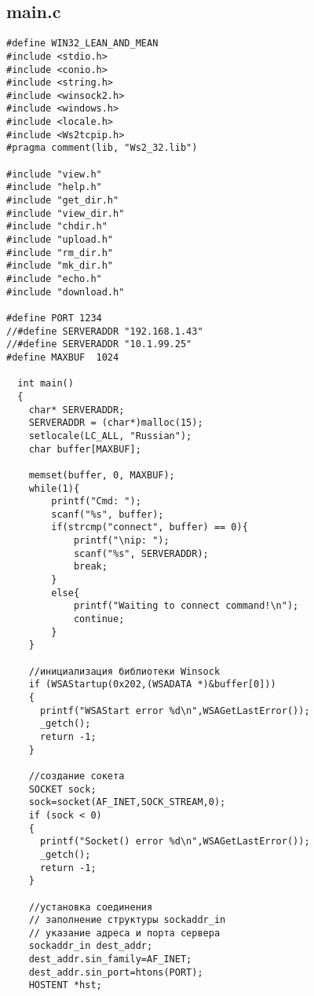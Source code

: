 \documentclass[12pt,a4paper]{report}
\begin{document}
\subsection*{main.c}
\begin{lstlisting}
#define WIN32_LEAN_AND_MEAN  
#include <stdio.h>
#include <conio.h>
#include <string.h>
#include <winsock2.h>
#include <windows.h>
#include <locale.h> 
#include <Ws2tcpip.h>
#pragma comment(lib, "Ws2_32.lib")

#include "view.h"
#include "help.h"
#include "get_dir.h"
#include "view_dir.h"
#include "chdir.h"
#include "upload.h"
#include "rm_dir.h"
#include "mk_dir.h"
#include "echo.h"
#include "download.h"

#define PORT 1234
//#define SERVERADDR "192.168.1.43"
//#define SERVERADDR "10.1.99.25"
#define MAXBUF  1024

  int main()
  {
	char* SERVERADDR;
	SERVERADDR = (char*)malloc(15);
    setlocale(LC_ALL, "Russian");
	char buffer[MAXBUF];
	
	memset(buffer, 0, MAXBUF);
	while(1){
		printf("Cmd: ");
		scanf("%s", buffer);
		if(strcmp("connect", buffer) == 0){
			printf("\nip: ");
			scanf("%s", SERVERADDR);
			break;
		}
		else{
			printf("Waiting to connect command!\n");
			continue;
		}
	}

    //инициализация библиотеки Winsock
    if (WSAStartup(0x202,(WSADATA *)&buffer[0]))
    {
      printf("WSAStart error %d\n",WSAGetLastError());
	  _getch();
      return -1;
    }

    //создание сокета
    SOCKET sock;
    sock=socket(AF_INET,SOCK_STREAM,0);
    if (sock < 0)
    {
      printf("Socket() error %d\n",WSAGetLastError());
	  _getch();
      return -1;
    }

    //установка соединения
    // заполнение структуры sockaddr_in
    // указание адреса и порта сервера
    sockaddr_in dest_addr;
    dest_addr.sin_family=AF_INET;
    dest_addr.sin_port=htons(PORT);
    HOSTENT *hst;


\end{lstlisting}
\end{document}
